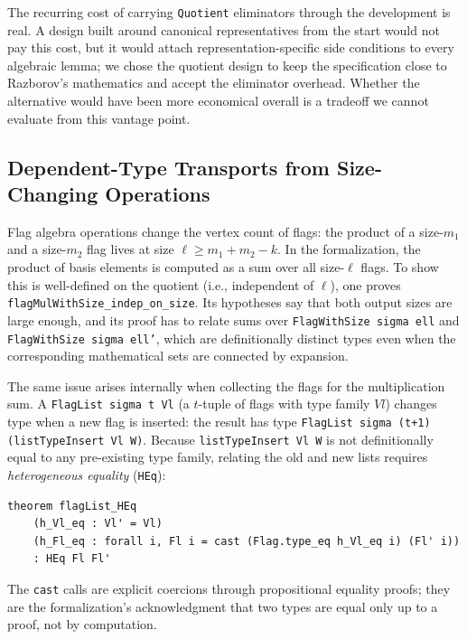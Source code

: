 \documentclass{article}
\newcommand{\lean}[1]{\texttt{#1}}
\begin{document}
The recurring cost of carrying \lean{Quotient} eliminators through the
development is real.  A design built around canonical representatives from the
start would not pay this cost, but it would attach representation-specific
side conditions to every algebraic lemma; we chose the quotient design to keep
the specification close to Razborov's mathematics and accept the eliminator
overhead.  Whether the alternative would have been more economical overall is
a tradeoff we cannot evaluate from this vantage point.

\subsection{Dependent-Type Transports from Size-Changing Operations}

Flag algebra operations change the vertex count of flags: the product of a
size-$m_1$ and a size-$m_2$ flag lives at size $\ell \geq m_1 + m_2 - k$.  In
the formalization, the product of basis elements is computed as a sum over
all size-$\ell$ flags.  To show this is well-defined on the quotient (i.e.,
independent of $\ell$), one proves \lean{flagMulWithSize\_indep\_on\_size}.
Its hypotheses say that both output sizes are large enough, and its proof has
to relate sums over \lean{FlagWithSize sigma ell} and
\lean{FlagWithSize sigma ell'}, which are definitionally distinct types even
when the corresponding mathematical sets are connected by expansion.

The same issue arises internally when collecting the flags for the
multiplication sum.  A \lean{FlagList sigma t Vl} (a $t$-tuple of flags with
type family $Vl$) changes type when a new flag is inserted: the result has
type \lean{FlagList sigma (t+1) (listTypeInsert Vl W)}.  Because
\lean{listTypeInsert Vl W} is not definitionally equal to any pre-existing
type family, relating the old and new lists requires \emph{heterogeneous
equality} (\lean{HEq}):
\begin{lstlisting}
theorem flagList_HEq
    (h_Vl_eq : Vl' = Vl)
    (h_Fl_eq : forall i, Fl i = cast (Flag.type_eq h_Vl_eq i) (Fl' i))
    : HEq Fl Fl'
\end{lstlisting}
The \lean{cast} calls are explicit coercions through propositional equality
proofs; they are the formalization's acknowledgment that two types are equal
only up to a proof, not by computation.
\end{document}
